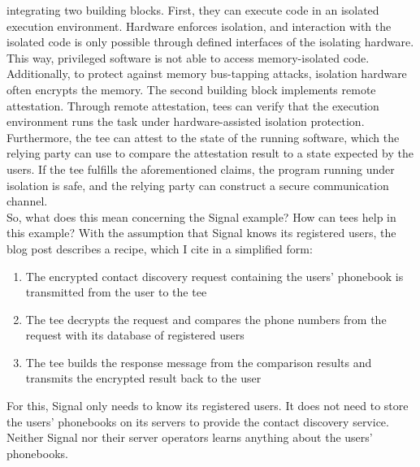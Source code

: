 integrating two building blocks. First, they can execute code in an isolated
execution environment. Hardware enforces isolation, and interaction with the
isolated code is only possible through defined interfaces of the isolating
hardware. This way, privileged software is not able to access memory-isolated
code. Additionally, to protect against memory bus-tapping attacks, isolation
hardware often encrypts the memory. The second building block implements remote
attestation. Through remote attestation, \glspl{tee} can verify that the
execution environment runs the task under hardware-assisted isolation
protection. Furthermore, the \gls{tee} can attest to the state of the running
software, which the relying party can use to compare the attestation result to a
state expected by the users. If the \gls{tee} fulfills the aforementioned
claims, the program running under isolation is safe, and the relying party can
construct a secure communication channel.\\

So, what does this mean concerning the Signal example? How can \glspl{tee} help
in this example? With the assumption that Signal knows its registered users, the
blog post describes a recipe, which I cite in a simplified form:
\begin{enumerate}
  \item The encrypted contact discovery request containing the users' phonebook
    is transmitted from the user to the \gls{tee}
  \item The \gls{tee} decrypts the request and compares the phone numbers from
    the request with its database of registered users
  \item The \gls{tee} builds the response message from the comparison results
    and transmits the encrypted result back to the user
\end{enumerate}
For this, Signal only needs to know its registered users. It does not need to
store the users' phonebooks on its servers to provide the contact discovery
service. Neither Signal nor their server operators learns anything about the
users' phonebooks.

